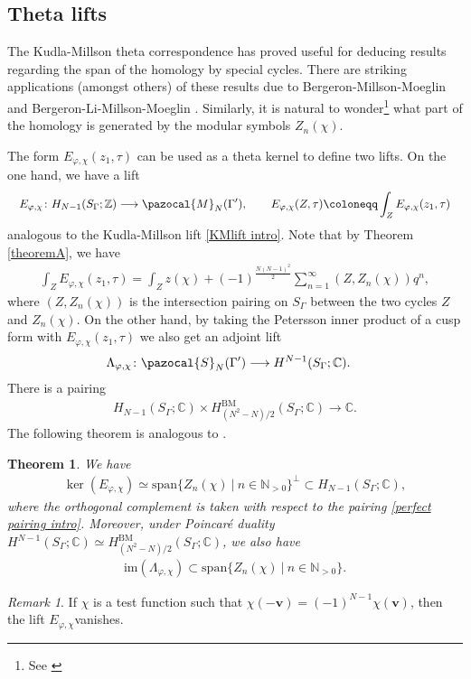 \documentclass[a4paper,11pt]{amsart} %
\newcommand{\8}{\infty}
\newcommand{\Z}{\mathbb{Z}}
\newcommand{\NN}{\mathbb{N}}
\newcommand{\vbf}{\mathbf{v}}
\newcommand{\Span}{\mathrm{span}}
\newcommand{\BM}{\mathrm{BM}}
\newcommand{\C}{\mathbb{C}}
\newcommand{\Scal}{\pazocal{S}}
\newcommand{\image}{\mathrm{im}}
\newcommand{\Mcal}{\pazocal{M}}
\theoremstyle{mytheoremstyle}
\newtheorem{thm}{Theorem}[section]
\theoremstyle{remark}
\newtheorem{rmk}{Remark}[section]
\numberwithin{equation}{section}
\begin{document}
\subsection{Theta lifts} The Kudla-Millson theta correspondence has proved useful for deducing results regarding the span of the homology by special cycles. There are striking applications (amongst others) of these results due to Bergeron-Millson-Moeglin \cite{bmm} and Bergeron-Li-Millson-Moeglin \cite{blmm}. Similarly, it is natural to wonder\footnote{See \cite[Question~(a), p.~2]{mazur}} what part of the homology is generated by the modular symbols $Z_n(\chi)$.


The form $E_{\varphi, \chi}(z_1,\tau)$ can be used as a theta kernel to define two lifts. On the one hand, we have a lift
\begin{align} \label{lift117}
\quad E_{\varphi, \chi} \colon H_{N-1}(S_\Gamma;\Z)& \longrightarrow \Mcal_N(\Gamma'), \qquad E_{\varphi, \chi}(Z,\tau)\coloneqq \int_Z E_{\varphi, \chi}(z_1,\tau)
\end{align}
analogous to the Kudla-Millson lift \eqref{KMlift intro}. Note that by Theorem \ref{theoremA}, we have
\begin{align}
\int_Z E_{\varphi, \chi}(z_1,\tau)=\int_{Z} z(\chi)+(-1)^{\frac{N(N-1)^2}{2}}\sum_{n=1}^\8 (Z,Z_n(\chi))q^n,
\end{align}
where $(Z,Z_n(\chi))$ is the intersection pairing on $S_\Gamma$ between the two cycles $Z$ and $Z_n(\chi)$.
On the other hand, by taking the Petersson inner product of a cusp form with $E_{\varphi, \chi}(z_1,\tau)$ we also get an adjoint lift
\begin{align}
\Lambda_{\varphi, \chi} \colon \Scal_N(\Gamma') & \longrightarrow H^{N-1}(S_{\Gamma};\C).
\end{align}
There is a pairing
\begin{align} \label{perfect pairing intro}
 H_{N-1}(S_\Gamma;\C) \times H^{\BM}_{(N^2-N)/2}(S_\Gamma;\C) \longrightarrow \C.
\end{align}
The following theorem is analogous to  \cite[Theorem.~4.5]{kmcjm}.
\begin{thm} \label{theoremC} We have
\begin{align}
\ker(E_{\varphi, \chi}) \simeq \Span \{Z_n(\chi) \ \vert \ n \in \NN_{>0} \}^\perp \subset H_{N-1}(S_\Gamma;\C),
\end{align}
where the orthogonal complement is taken with respect to the pairing \eqref{perfect pairing intro}. Moreover, under Poincaré duality $H^{N-1}(S_\Gamma;\C) \simeq H^{\BM}_{(N^2-N)/2}(S_\Gamma;\C)$, we also have
\begin{align}
\image(\Lambda_{\varphi, \chi}) \subset \Span \{Z_n(\chi) \ \vert \ n \in \NN_{>0} \}.
\end{align}
\end{thm}
 \begin{rmk} If $\chi$ is a test function such that $\chi(-\vbf)=(-1)^{N-1}\chi(\vbf)$, then the lift $E_{\varphi, \chi}$vanishes.
 \end{rmk}
\end{document}

